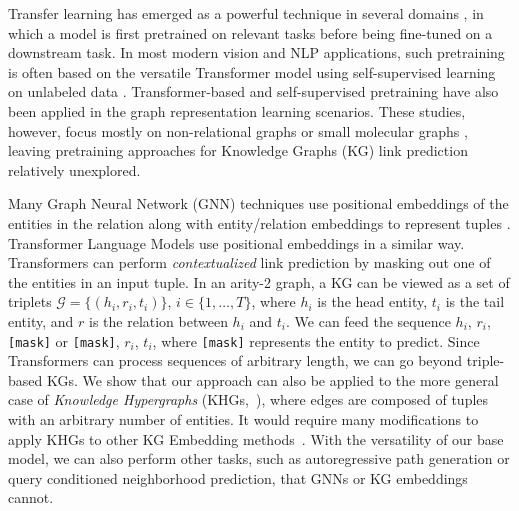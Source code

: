 \documentclass{article}
\newcommand{\mask}{\mbox{\texttt{[mask]}}}
\begin{document}
Transfer learning has emerged as a powerful technique in several domains \cite{s2s-unsupervised,glove,tomar-etal-2017-neural,subramanian2018learning,conv_transf2014,yosinski2014transferable,selfie2019}, in which a model is first pretrained on relevant tasks before being fine-tuned on a downstream task.
In most modern vision and NLP applications, such pretraining is often based on the versatile Transformer model \cite{transformer2017} using self-supervised learning on unlabeled data \cite{bert,t5,bao2022beit}.
Transformer-based and self-supervised pretraining have also been applied in the graph representation learning scenarios. 
These studies, however, focus mostly on non-relational graphs \cite{bgrl,slaps} or small molecular graphs \cite{graphormer},
leaving pretraining approaches for Knowledge Graphs (KG) link prediction relatively unexplored.


Many Graph Neural Network (GNN) techniques use positional embeddings of the entities in the relation along with entity/relation embeddings to represent tuples \cite{you2019position}.
Transformer Language Models \cite{transformer2017} use positional embeddings in a similar way. 
Transformers can perform \emph{contextualized} link prediction by masking out one of the entities in an input tuple.
In an arity-2 graph, a KG can be viewed as a set of triplets $\mathcal{G} = \{(h_i, r_i, t_i)\}$, $i\in \{1,\dotsc, T\}$, where $h_i$ is the head entity, $t_i$ is the tail entity, and $r$ is the relation between $h_i$ and $t_i$. 
We can feed the sequence $h_i$, $r_i$, \mask{} or \mask{}, $r_i$, $t_i$, where \mask{} represents the  entity to predict.
Since Transformers can process sequences of arbitrary length, we can go beyond triple-based KGs.
We show that our approach can also be applied to the more general case of  \emph{Knowledge Hypergraphs} (KHGs,~\citeauthor{fatemiijcai2020}), where edges are composed of tuples with an arbitrary number of entities.
It would require many modifications to apply KHGs to other KG Embedding methods~\cite{fatemiijcai2020}.
With the versatility of our base model, we can also perform other tasks, such as autoregressive path generation or query conditioned neighborhood prediction, that GNNs or KG embeddings cannot.
\end{document}
